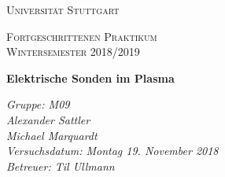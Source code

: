 \documentclass[aps,amsmath,amssymb,amsfont]{revtex4-1}
\numberwithin{equation}{section}
\begin{document}
	\begin{titlepage}
	\centering
	\par\vspace{1cm}
	{\scshape\LARGE Universität Stuttgart \par}
	\vspace{1cm}
	{\scshape\Large  Fortgeschrittenen Praktikum \\ Wintersemester 2018/2019\par}
	\vspace{1.5cm}
	{\huge\bfseries Elektrische Sonden im Plasma\par}
	\vspace{2cm}
	{\Large\itshape Gruppe: M09\\ Alexander Sattler  \\  Michael Marquardt    \\ Versuchsdatum: Montag 19. November 2018\\ Betreuer: Til Ullmann\\ \par}
	
	\end{titlepage}


\tableofcontents




\FloatBarrier

\FloatBarrier
{}
\end{document}

